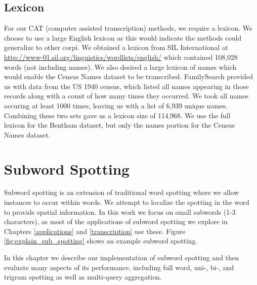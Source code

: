 \documentclass[ms,electronic,twosidetoc,letterpaper,chaptercenter,parttop,lof,lot]{byumsphd}
\begin{document}
\section{Lexicon}

For our CAT (computer assisted transcription) methods, we require a lexicon. We choose to use a large English lexicon as this would indicate the methods could generalize to other corpi. We obtained a lexicon from SIL International at \url{http://www-01.sil.org/linguistics/wordlists/english/} which contained 108,028 words (not including names). We also desired a large lexicon of names which would enable the Census Names dataset to be transcribed. FamilySearch provided us with data from the US 1940 census, which listed all names appearing in those records along with a count of how many times they occurred. We took all names occuring at least 1000 times, leaving us with a list of 6,939 unique names. Combining these two sets gave us a lexicon size of 114,968. We use the full lexicon for the Bentham dataset, but only the names portion for the Census Names dataset.

\chapter{Subword Spotting}\label{subwordspotting}

Subword spotting is an extension of traditional word spotting where we allow instances to occur within words. We attempt to localize the spotting in the word to provide spatial information. In this work we focus on small subwords (1-3 characters), as most of the applications of subword spotting we explore in Chapters \ref{applications} and \ref{transcription} use these. Figure \ref{fig:explain_sub_spotting} shows an example subword spotting.

In this chapter we describe our implementation of subword spotting and then evaluate many aspects of its performance, including full word, uni-, bi-, and trigram spotting as well as multi-query aggregation.
\end{document}
